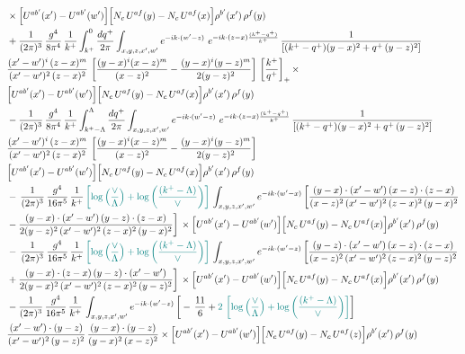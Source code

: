 \documentclass[9pt]{article}
\numberwithin{equation}{section}
\begin{document}
\begin{align}
&\times\Big[U^{ab'}(x')-U^{ab'}(w')\Big]\Big[N_{c}\,U^{af}(y)-N_{c}\,U^{af}(x)\Big]\rho^{b'}(x')\,\rho^{f}(y)\notag \\ & + \frac{1}{(2\pi)^{3}}\,\frac{g^{4}}{8\pi^{4}}\,\frac{1}{k^{+}}\int_{k^{+}}^{0}\frac{dq^{+}}{2\pi}\int_{x,y,z,x',w'}e^{-ik\cdot(w'-z)}\ e^{-ik\cdot(z-x)\frac{(k^{+}-q^{+})}{k^{+}}}\,\frac{1}{\left[(k^{+}-q^{+})(y-x)^{2}+q^{+}\,(y-z)^{2}\right]}\notag \\ & \frac{(x'-w')^{i}\,(z-x)^{m}}{(x'-w')^{2}\,(z-x)^{2}}\,\left[\frac{(y-x)^{i}(x-z)^{m}}{(x-z)^{2}}-\frac{(y-x)^{i}(y-z)^{m}}{2(y-z)^{2}}\right]\,\left[\frac{k^{+}}{q^{+}}\right]_{+}\times\notag \\ & \Big[U^{ab'}(x')-U^{ab'}(w')\Big]\Big[N_{c}\,U^{af}(y)-N_{c}\,U^{af}(x)\Big]\rho^{b'}(x')\,\rho^{f}(y)\notag \\ & - \frac{1}{(2\pi)^{3}}\,\frac{g^{4}}{8\pi^{4}}\,\frac{1}{k^{+}}\int_{k^{+}-\Lambda}^{\Lambda}\frac{dq^{+}}{2\pi}\int_{x,y,z,x',w'}e^{-ik\cdot(w'-z)}\ e^{-ik\cdot(z-x)\frac{(k^{+}-q^{+})}{k^{+}}}\,\frac{1}{\left[(k^{+}-q^{+})(y-x)^{2}+q^{+}\,(y-z)^{2}\right]}\notag \\ & \frac{(x'-w')^{i}\,(z-x)^{m}}{(x'-w')^{2}\,(z-x)^{2}}\,\left[\frac{(y-x)^{i}(x-z)^{m}}{(x-z)^{2}}-\frac{(y-x)^{i}(y-z)^{m}}{2(y-z)^{2}}\right]\notag \\ & \Big[U^{ab'}(x')-U^{ab'}(w')\Big]\Big[N_{c}\,U^{af}(y)-N_{c}\,U^{af}(x)\Big]\rho^{b'}(x')\,\rho^{f}(y)\notag \\ & -\, \frac{1}{(2\pi)^{3}}\,\frac{g^{4}}{16\pi^{5}}\,\frac{1}{k^{+}}\,{\color{teal}\left[\log{\left(\frac{\vee}{\Lambda}\right)} + \log{\left(\frac{(k^{+}-\Lambda)}{\vee}\right)}\right]}\,\int_{x,y,z,x',w'}e^{-ik\cdot(w'-x)}\, \bigg[\frac{(y-x)\cdot (x'-w')\,(x-z)\cdot (z-x)}{(x-z)^{2}\,(x'-w')^{2}\,(z-x)^{2}\,(y-x)^{2}}\notag \\ & -\frac{(y-x)\cdot (x'-w')\,(y-z)\cdot (z-x)}{2(y-z)^{2}\,(x'-w')^{2}\,(z-x)^{2}\,(y-x)^{2}}\bigg]\,\times \Big[U^{ab'}(x')-U^{ab'}(w')\Big]\Big[N_{c}\,U^{af}(y)-N_{c}\,U^{af}(x)\Big]\rho^{b'}(x')\,\rho^{f}(y)\notag \\ & -\, \frac{1}{(2\pi)^{3}}\,\frac{g^{4}}{16\pi^{5}}\,\frac{1}{k^{+}}\,{\color{teal}\left[\log{\left(\frac{\vee}{\Lambda}\right)} + \log{\left(\frac{(k^{+}-\Lambda)}{\vee}\right)}\right]}\,\int_{x,y,z,x',w'}e^{-ik\cdot(w'-z)}\,\bigg[\frac{(y-z)\cdot (x'-w')\,(x-z)\cdot (z-x)}{(x-z)^{2}\,(x'-w')^{2}\,(z-x)^{2}\,(y-z)^{2}}\notag \\ & +\frac{(y-x)\cdot (z-x)\,(y-z)\cdot (x'-w')}{2(y-x)^{2}\,(x'-w')^{2}\,(z-x)^{2}\,(y-z)^{2}}\bigg]\,\times \Big[U^{ab'}(x')-U^{ab'}(w')\Big]\Big[N_{c}\,U^{af}(y)-N_{c}\,U^{af}(x)\Big]\rho^{b'}(x')\,\rho^{f}(y)\notag \\ & - \frac{1}{(2\pi)^{3}}\,\frac{g^{4}}{16\pi^{5}}\,\frac{1}{k^{+}}\,\int_{x,y,z,x',w'}e^{-ik\cdot(w'-z)}\,\bigg[-\,\frac{11}{6}+{\color{teal}2\,\left[\log{\left(\frac{\vee}{\Lambda}\right)} + \log{\left(\frac{(k^{+}-\Lambda)}{\vee}\right)}\right]}\bigg]\notag \\ & \frac{(x'-w')\cdot(y-z)}{(x'-w')^{2}\,(y-z)^{2}}\,\frac{(y-x)\cdot(y-z)}{(y-x)^{2}\,(x-z)^{2}}\times\Big[U^{ab'}(x')-U^{ab'}(w')\Big]\Big[N_{c}\,U^{af}(y)-N_{c}\,U^{af}(z)\Big]\rho^{b'}(x')\,\rho^{f}(y)
\end{align}
\begingroup\color{blue}
\end{document}
